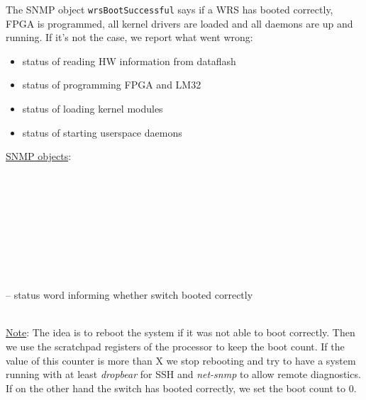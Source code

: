 \begin{pck_descr}
				The SNMP object \texttt{wrsBootSuccessful} says if a WRS has booted
				correctly, FPGA is programmed, all kernel drivers are loaded and all
				daemons are up and running. If it's not the case, we report what went
				wrong:
				\begin{itemize}
					\item status of reading HW information from dataflash
					\item status of programming FPGA and LM32
					\item status of loading kernel modules
					\item status of starting userspace daemons
				\end{itemize}
			\item [] \underline{SNMP objects}:\\
        {\footnotesize
				\\
				\\
				\\
				\\
				\\
				\\
				\\
				\\
				\\
				 -- status word informing whether switch booted correctly\\
				\\
         }
			\item [] \underline{Note}: 
				The idea is to reboot the system if it was not able to boot correctly.
				Then we use the scratchpad registers of the processor to keep
				the boot count. If the value of this counter is more than X we stop
				rebooting and try to have a system running with at least \emph{dropbear}
				for SSH and \emph{net-snmp} to allow remote diagnostics. If on the other
				hand the switch has booted correctly, we set the boot count to 0.
		\end{pck_descr}


